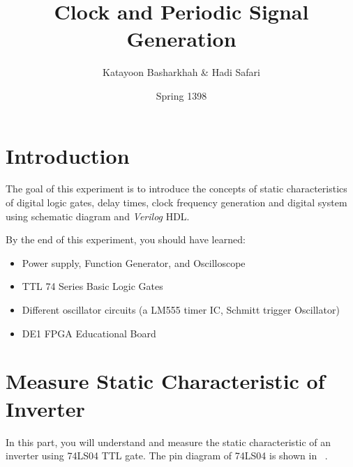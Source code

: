 \documentclass[12pt, logo=tehranDLDL/ut]{tehranDLDL}
\title{Clock and Periodic Signal Generation}
\author{Katayoon Basharkhah \& Hadi Safari}
\date{Spring 1398}
\begin{document}
\maketitle

\tableofcontents
\newpage

\section*{Introduction}

The goal of this experiment is to introduce the concepts of static characteristics of digital logic gates, delay times, clock frequency generation and digital system using schematic diagram and \textit{Verilog} HDL.

By the end of this experiment, you should have learned:

\begin{itemize}
    \item Power supply, Function Generator, and Oscilloscope
    \item TTL 74 Series Basic Logic Gates 
    \item Different oscillator circuits (a LM555 timer IC, Schmitt trigger Oscillator)
    \item DE1 FPGA Educational Board
\end{itemize}

\section{Measure Static Characteristic of Inverter}
In this part, you will understand and measure the static characteristic of an inverter using 74LS04 TTL gate. The pin diagram of 74LS04 is shown in ~.
\end{document}
